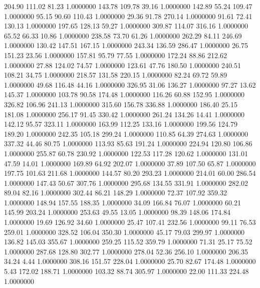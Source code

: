  204.90  111.02   81.23   1.0000000
 143.78  109.78   39.16   1.0000000
 142.89   55.24  109.47   1.0000000
  95.15   90.60  110.43   1.0000000
  29.36   91.78  270.14   1.0000000
  91.61   72.41  130.13   1.0000000
 197.65  128.13   59.27   1.0000000
 309.87  114.07  316.16   1.0000000
  65.52   66.33   10.86   1.0000000
 238.58   73.70   61.26   1.0000000
 262.29   84.11  246.69   1.0000000
 130.42  147.51  167.15   1.0000000
 243.34  136.59  286.47   1.0000000
  26.75  151.23   23.56   1.0000000
 157.81   95.79   77.55   1.0000000
 172.24   88.86  212.62   1.0000000
  27.88  124.02   74.57   1.0000000
 123.61   47.76  180.50   1.0000000
 240.51  108.21   34.75   1.0000000
 218.57  131.58  220.15   1.0000000
  82.24   69.72   59.89   1.0000000
  49.68  116.48   44.16   1.0000000
 326.95   31.06  136.27   1.0000000
  97.27   13.62  145.37   1.0000000
 103.78   90.58  174.48   1.0000000
 116.26   60.88  152.95   1.0000000
 326.82  106.96  241.13   1.0000000
 315.60  156.78  336.88   1.0000000
 186.40   25.15  181.08   1.0000000
 256.17   91.45  330.42   1.0000000
 261.24  134.26   14.41   1.0000000
 142.12   95.57  323.11   1.0000000
 163.99  112.25  133.16   1.0000000
 199.56  124.79  189.20   1.0000000
 242.35  105.18  299.24   1.0000000
 110.85   64.39  274.63   1.0000000
 337.32   44.46   80.75   1.0000000
 113.93   85.63  191.24   1.0000000
 224.94  120.80  106.86   1.0000000
 255.87   60.78  230.92   1.0000000
 122.53  117.28  120.62   1.0000000
 131.01   47.59   14.01   1.0000000
 169.89   64.92  202.07   1.0000000
  37.89  107.50   65.87   1.0000000
 197.75  101.63  211.68   1.0000000
 144.57   80.20  293.23   1.0000000
 214.01   60.00  286.54   1.0000000
 147.43   50.67  307.76   1.0000000
 295.68  134.55  331.91   1.0000000
 282.02   89.04   82.16   1.0000000
 302.44   86.21  148.29   1.0000000
  72.37  107.92  359.32   1.0000000
 148.94  157.55  188.35   1.0000000
  34.09  166.84   76.07   1.0000000
  60.21  145.99  203.24   1.0000000
 253.63   49.55   13.05   1.0000000
  98.39  148.06  174.84   1.0000000
  19.69  126.92   34.60   1.0000000
  25.47  107.41  232.56   1.0000000
  99.11   76.53  259.01   1.0000000
 328.52  106.04  350.30   1.0000000
  45.17   79.03  299.97   1.0000000
 136.82  145.03  355.67   1.0000000
 259.25  115.52  359.79   1.0000000
  71.31   25.17   75.52   1.0000000
 287.68  128.80  302.77   1.0000000
 278.04   52.36  256.10   1.0000000
 206.35   34.24    4.44   1.0000000
 308.16  151.57  228.04   1.0000000
  25.70   82.67  174.48   1.0000000
   5.43  172.02  188.71   1.0000000
 103.32   88.74  305.97   1.0000000
  22.00  111.33  224.48   1.0000000

